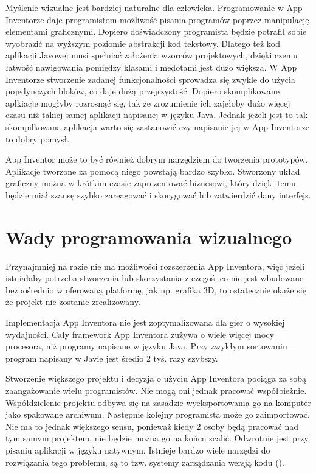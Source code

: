 Myślenie wizualne jest bardziej naturalne dla człowieka. Programowanie w App Inventorze daje programistom możliwość pisania programów poprzez manipulację elementami graficznymi. Dopiero doświadczony programista będzie potrafił sobie wyobrazić na wyższym poziomie abstrakcji kod tekstowy. Dlatego też kod aplikacji Javowej musi spełniać założenia wzorców projektowych, dzięki czemu łatwość nawigowania pomiędzy klasami i medotami jest dużo większa. W App Inventorze stworzenie zadanej funkcjonalności sprowadza się zwykle do użycia pojedynczych bloków, co daje dużą przejrzystość. Dopiero skomplikowane aplkiacje mogłyby rozrosnąć się, tak że zrozumienie ich zajełoby dużo więcej czasu niż takiej samej aplikacji napisanej w języku Java. Jednak jeżeli jest to tak skompilkowana aplikacja warto się zastanowić czy napisanie jej w App Inventorze to dobry pomysł.

App Inventor może to być również dobrym narzędziem do tworzenia prototypów. Aplikacje tworzone za pomocą niego powstają bardzo szybko. Stworzony układ graficzny można w krótkim czasie zaprezentować biznesowi, który dzięki temu będzie miał szansę szybko zareagować i skorygować lub zatwierdzić dany interfejs.

\section{Wady programowania wizualnego}

Przynajmniej na razie nie ma możliwości rozszerzenia App Inventora, więc jeżeli istniałaby potrzeba stworzenia lub skorzystania z czegoś, co nie jest wbudowane bezpośrednio w oferowaną platformę, jak np. grafika 3D, to ostatecznie okaże się że projekt nie zostanie zrealizowany.

Implementacja App Inventora nie jest zoptymalizowana dla gier o wysokiej wydajności. Cały framework App Inventora zużywa o wiele więcej mocy procesora, niż programy napisane w języku Java. Przy zwykłym sortowaniu program napisany w Javie jest średio 2 tyś. razy szybszy.

Stworzenie większego projektu i decyzja o użyciu App Inventora pociąga za sobą zaangażowanie wielu programistów. Nie mogą oni jednak pracować współbieżnie. Współdzielenie projektu odbywa się na zasadzie wyeksportowania go na komputer jako spakowane archiwum. Następnie kolejny programista może go zaimportować. Nie ma to jednak większego sensu, ponieważ kiedy 2 osoby będą pracować nad tym samym projektem, nie będzie można go na końcu scalić. Odwrotnie jest przy pisaniu aplikacji w języku natywnym. Istnieje bardzo wiele narzędzi do rozwiązania tego problemu, są to tzw. systemy zarządzania wersją kodu ().
